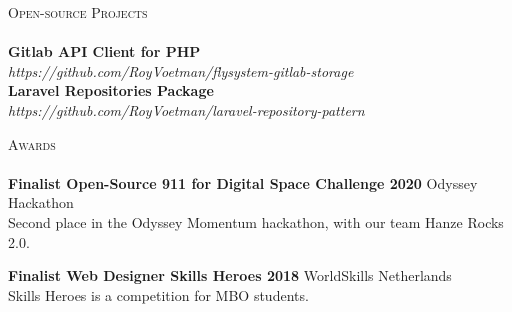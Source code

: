 \documentclass[a4paper]{article}
\newcommand{\lineunder} {
    \vspace*{-8pt} \\
    \hspace*{-18pt} \hrulefill \\
}
\newcommand{\header} [1] {
    {\hspace*{-18pt}\vspace*{6pt} \textsc{#1}}
    \vspace*{-6pt} \lineunder
}
\begin{document}
\vspace{5mm}

\header{Open-source Projects}
{\textbf{Gitlab API Client for PHP}} \\ \emph{https://github.com/RoyVoetman/flysystem-gitlab-storage}\\
\vspace*{2mm}
{\textbf{Laravel Repositories Package}} \\ \emph{https://github.com/RoyVoetman/laravel-repository-pattern}\\
\vspace*{2mm}

\vspace{5mm}

\header{Awards}
\textbf{Finalist Open-Source 911 for Digital Space Challenge 2020} \hfill Odyssey Hackathon\\
Second place in the Odyssey Momentum hackathon, with our team Hanze Rocks 2.0.
\vspace*{2mm}

\textbf{Finalist Web Designer Skills Heroes 2018} \hfill WorldSkills Netherlands\\
Skills Heroes is a competition for MBO students.
\vspace*{2mm}

\ 
\end{document}
